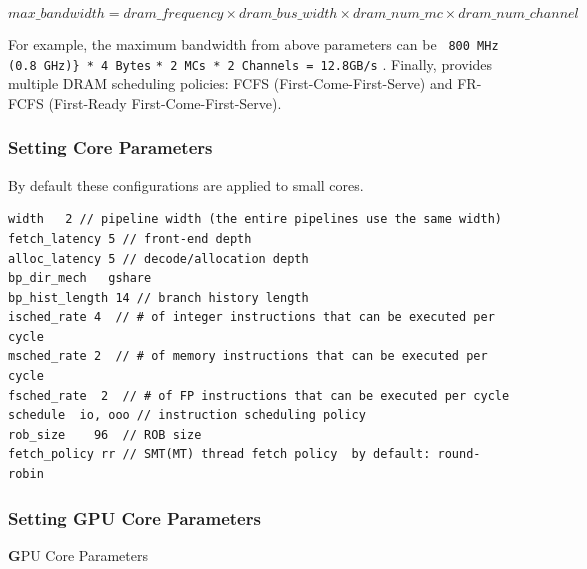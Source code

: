 \begin{equation}
\label{eq:bandwidth}
max\_bandwidth = dram\_frequency \times dram\_bus\_width \times dram\_num\_mc \times dram\_num\_channel 
\end{equation}

For example, the maximum bandwidth from above parameters can be
\Verb+ 800 MHz (0.8 GHz)} * 4 Bytes+
  \Verb+* 2 MCs * 2 Channels = 12.8GB/s+ . Finally, \SIM provides
  multiple DRAM scheduling policies: FCFS (First-Come-First-Serve) and
  FR-FCFS (First-Ready First-Come-First-Serve).


\subsubsection{Setting \cpu Core Parameters}

By default these configurations are applied to small cores. 

\begin{Verbatim}
width   2 // pipeline width (the entire pipelines use the same width) 
fetch_latency 5 // front-end depth 
alloc_latency 5 // decode/allocation depth  
bp_dir_mech   gshare 
bp_hist_length 14 // branch history length 
isched_rate 4  // # of integer instructions that can be executed per cycle 
msched_rate 2  // # of memory instructions that can be executed per cycle 
fsched_rate  2  // # of FP instructions that can be executed per cycle 
schedule  io, ooo // instruction scheduling policy 
rob_size    96  // ROB size
fetch_policy rr // SMT(MT) thread fetch policy  by default: round-robin 
\end{Verbatim}


\subsubsection{Setting GPU Core Parameters}
{\textbf GPU Core Parameters} 



